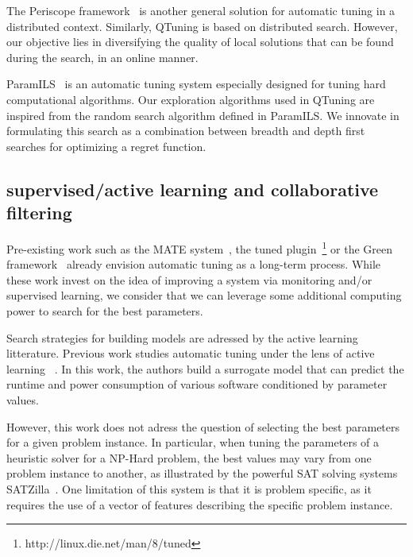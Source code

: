 \documentclass[10pt, conference, compsocconf]{IEEEtran}
\begin{document}
The Periscope framework~\cite{DBLP:conf/parco/MijakovicSUGSC13} is another
general solution for automatic tuning in a distributed context.
Similarly, QTuning is based on distributed search. However, our objective lies in
diversifying the quality of local solutions that can be found
during the search, in an online manner.

ParamILS~\cite{Hutter:2009:PAA:1734953.1734959} is an automatic tuning system
especially designed for tuning hard computational algorithms. Our
exploration algorithms used in QTuning are inspired from the random search
algorithm defined in ParamILS. We innovate in formulating this search
as a combination between breadth and depth first searches for optimizing a
regret function.

\subsection{supervised/active learning and collaborative filtering}

Pre-existing work such as the MATE system~\cite{DBLP:conf/para/MorajkoMCMS10},
the tuned plugin~\footnote{http://linux.die.net/man/8/tuned} or the Green
framework~\cite{Baek:2010:GFS:1809028.1806620} already envision automatic
tuning as a long-term process. While these work invest on the idea of
improving a system via monitoring and/or supervised learning, we consider
that we can leverage some additional computing power to search for the best 
parameters.

Search strategies for building models are adressed by the
active learning~\cite{DBLP:series/synthesis/2012Settles} litterature.
Previous work studies automatic tuning under the lens of active learning
~\cite{DBLP:conf/cluster/BalaprakashGW13}. In this work, the authors build a
surrogate model that can predict the runtime and power consumption of various
software conditioned by parameter values.

However, this work does not adress the question of selecting the best
parameters for a given problem instance. In particular, when tuning the
parameters of a heuristic solver for a NP-Hard problem, the best values may
vary from one problem instance to another, as illustrated by the powerful SAT
solving systems SATZilla~\cite{xu2008satzilla}. One limitation of this system
is that it is problem specific, as it requires the use of a vector of features
describing the specific problem instance.
\end{document}
